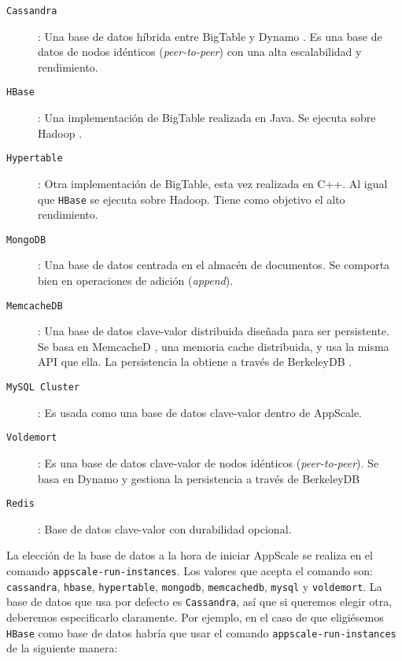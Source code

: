 \begin{description}
\item[\texttt{Cassandra}] \cite{appscale-cassandra}: Una base de datos híbrida entre BigTable \cite{appscale-bigtable} y Dynamo \cite{appscale-dynamo}. Es una base de datos de nodos idénticos (\emph{peer-to-peer}) con una alta escalabilidad y rendimiento.
\item[\texttt{HBase}] \cite{appscale-hbase}: Una implementación de BigTable realizada en Java. Se ejecuta sobre Hadoop \cite{appscale-hadoop}.
\item[\texttt{Hypertable}] \cite{appscale-hypertable}: Otra implementación de BigTable, esta vez realizada en C++. Al igual que \texttt{HBase} se ejecuta sobre Hadoop. Tiene como objetivo el alto rendimiento.
\item[\texttt{MongoDB}] \cite{appscale-mongodb}: Una base de datos centrada en el almacén de documentos. Se comporta bien en operaciones de adición (\emph{append}).
\item[\texttt{MemcacheDB}] \cite{appscale-memcachedb}: Una base de datos clave-valor distribuida diseñada para ser persistente. Se basa en MemcacheD \cite{appscale-memcached}, una memoria cache distribuida, y usa la misma API que ella. La persistencia la obtiene a través de BerkeleyDB \cite{appscale-berkeleydb}.
\item[\texttt{MySQL Cluster}] \cite{appscale-mysql}: Es usada como una base de datos clave-valor dentro de AppScale.
\item[\texttt{Voldemort}] \cite{appscale-voldemort}: Es una base de datos clave-valor de nodos idénticos (\emph{peer-to-peer}). Se basa en Dynamo y gestiona la persistencia a través de BerkeleyDB
\item[\texttt{Redis}] \cite{appscale-redis}: Base de datos clave-valor con durabilidad opcional.
\end{description}

La elección de la base de datos a la hora de iniciar AppScale se realiza en el comando \texttt{appscale-run-instances}. Los valores que acepta el comando son: \texttt{cassandra}, \texttt{hbase}, \texttt{hypertable}, \texttt{mongodb}, \texttt{memcachedb}, \texttt{mysql} y \texttt{voldemort}. La base de datos que usa por defecto es \texttt{Cassandra}, así que si queremos elegir otra, deberemos especificarlo claramente. Por ejemplo, en el caso de que eligiésemos \texttt{HBase} como base de datos habría que usar el comando \texttt{appscale-run-instances} de la siguiente manera:

